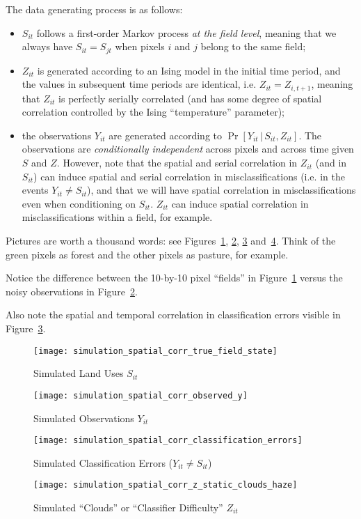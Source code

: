 \documentclass[12pt]{article}
\begin{document}
The data generating process is as follows:
\begin{itemize}
\item $S_{it}$ follows a first-order Markov process \textit{at the field level}, meaning that we always have $S_{it} = S_{jt}$ when pixels $i$ and $j$ belong to the same field;
\item $Z_{it}$ is generated according to an Ising model in the initial time period, and the values in subsequent time periods are identical, i.e. $Z_{it} = Z_{i,t+1}$, meaning that $Z_{it}$ is perfectly serially correlated (and has some degree of spatial correlation controlled by the Ising ``temperature'' parameter);
\item the observations $Y_{it}$ are generated according to $\Pr\left[Y_{it} \,|\, S_{it}, Z_{it}\right]$. The observations are \textit{conditionally independent} across pixels and across time given $S$ and $Z$. However, note that the spatial and serial correlation in $Z_{it}$ (and in $S_{it}$) can induce spatial and serial correlation in misclassifications (i.e. in the events $Y_{it} \neq S_{it}$), and that we will have spatial correlation in misclassifications even when conditioning on $S_{it}$. $Z_{it}$ can induce spatial correlation in misclassifications within a field, for example.
\end{itemize}

Pictures are worth a thousand words: see Figures~\ref{fig:landuses}, \ref{fig:observations}, \ref{fig:classificationerrors} and~\ref{fig:z}.
Think of the green pixels as forest and the other pixels as pasture, for example.

Notice the difference between the 10-by-10 pixel ``fields'' in Figure~\ref{fig:landuses}
versus the noisy observations in Figure~\ref{fig:observations}.

Also note the spatial and temporal correlation in classification errors visible in Figure~\ref{fig:classificationerrors}.

\begin{figure}[h]
  \centering
  \texttt{[image: simulation\_spatial\_corr\_true\_field\_state]}
  \caption{Simulated Land Uses $S_{it}$\label{fig:landuses}}
\end{figure}

\begin{figure}[h]
  \centering
  \texttt{[image: simulation\_spatial\_corr\_observed\_y]}
  \caption{Simulated Observations $Y_{it}$\label{fig:observations}}
\end{figure}

\begin{figure}[h]
  \centering
  \texttt{[image: simulation\_spatial\_corr\_classification\_errors]}
  \caption{Simulated Classification Errors ($Y_{it} \neq S_{it}$)\label{fig:classificationerrors}}
\end{figure}

\begin{figure}[h]
  \centering
  \texttt{[image: simulation\_spatial\_corr\_z\_static\_clouds\_haze]}
  \caption{Simulated ``Clouds'' or ``Classifier Difficulty'' $Z_{it}$\label{fig:z}}
\end{figure}
\end{document}
